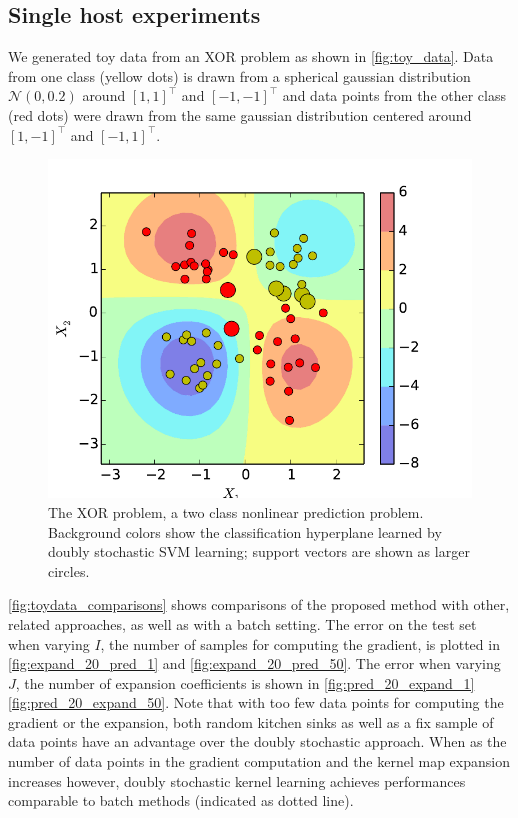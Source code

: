 \documentclass{article} %
\begin{document}
\subsection{Single host experiments}\label{sec:single_host}
We generated toy data from an XOR problem as shown in \autoref{fig:toy_data}. Data from one class (yellow dots) is drawn from a spherical gaussian distribution $\mathcal{N}(0,0.2)$ around $[1,1]^\top$ and $[-1,-1]^\top$ and data points from the other class (red dots) were drawn from the same gaussian distribution centered around $[1,-1]^\top$ and $[-1,1]^\top$. 
%
\begin{figure}[!ht]
    \centering
        \includegraphics[width=0.4\columnwidth]{imgs/svm_kernel}
        \caption{
        The XOR problem, a two class nonlinear prediction problem. Background colors show the classification hyperplane learned by doubly stochastic SVM learning; support vectors are shown as larger circles.}
        \label{fig:toy_data}
\end{figure}
%
\autoref{fig:toydata_comparisons} shows comparisons of the proposed method with other, related approaches, as well as with a batch setting. 
The error on the test set when varying $I$, the number of samples for computing the gradient, is plotted in \autoref{fig:expand_20_pred_1} and \autoref{fig:expand_20_pred_50}. The error when varying $J$, the number of expansion coefficients is shown in \autoref{fig:pred_20_expand_1} \autoref{fig:pred_20_expand_50}. Note that with too few data points for computing the gradient or the expansion, both random kitchen sinks as well as a fix sample of data points have an advantage over the doubly stochastic approach. When as the number of data points in the gradient computation and the kernel map expansion increases however, doubly stochastic kernel learning achieves performances comparable to batch methods (indicated as dotted line).
%
\end{document}
